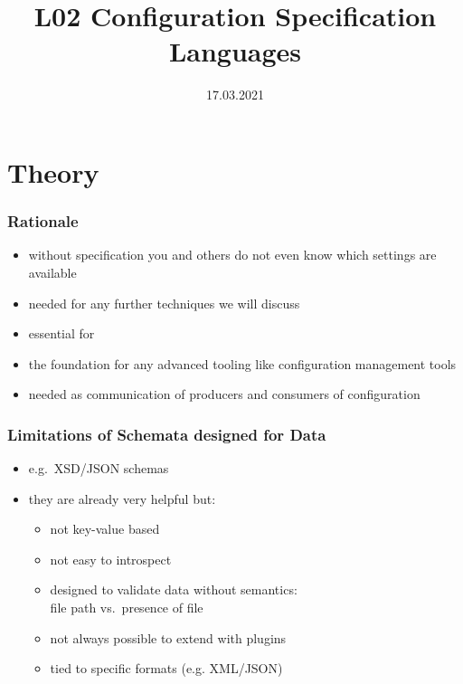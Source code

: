 

\title{L02 Configuration Specification Languages}
\date{17.03.2021}



\section{Theory}

\begin{frame}
	\frametitle{Rationale}
	\begin{itemize}
	\item without specification you and others do not even know which settings are available
	\item needed for any further techniques we will discuss
	\pause
	\item essential for ~\citet{holland2001nofutz}
	\item the foundation for any advanced tooling like configuration management tools
	\pause
	\item needed as communication of producers and consumers of configuration
	\end{itemize}
\end{frame}

\begin{frame}
	\methodQuestion{}
\end{frame}

\begin{frame}
	\frametitle{Limitations of Schemata designed for Data}
	\begin{itemize}
	\item e.g.\ XSD/JSON schemas
	\item they are already very helpful but:
	\pause
	\begin{itemize}
	\item not key-value based
	\item not easy to introspect
	\item designed to validate data without semantics: \\ file path vs.\ presence of file
	\item not always possible to extend with plugins
	\item tied to specific formats (e.g. XML/JSON)
	\end{itemize}
	\end{itemize}
\end{frame}

